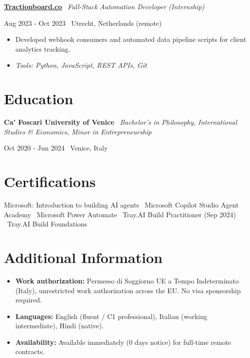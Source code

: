 \documentclass[a4paper,10pt]{article}
\newcommand{\role}[4]{%
  \vspace{2pt}\noindent
  \begin{minipage}[t]{0.70\textwidth}\raggedright\textbf{#1} \textbullet\ \textit{#3}\end{minipage}%
  \hfill
  \begin{minipage}[t]{0.28\textwidth}\raggedleft\footnotesize\color{gray}#2 \textbullet\ #4\end{minipage}%
  \vspace{1pt}%
}
\begin{document}
\role{\href{https://tractionboard.co}{Tractionboard.co}}{Aug 2023 - Oct 2023}{Full-Stack Automation Developer (Internship)}{Utrecht, Netherlands (remote)}
\begin{itemize}
  \item Developed webhook consumers and automated data pipeline scripts for client analytics tracking.
  \item \textit{Tools: Python, JavaScript, REST APIs, Git}
\end{itemize}

\section{Education}
\role{Ca' Foscari University of Venice}{Oct 2020 - Jun 2024}{Bachelor's in Philosophy, International Studies \& Economics, Minor in Entrepreneurship}{Venice, Italy}

\section{Certifications}
Microsoft: Introduction to building AI agents \textbullet\ Microsoft Copilot Studio Agent Academy \textbullet\ Microsoft Power Automate \textbullet\ Tray.AI Build Practitioner (Sep 2024) \textbullet\ Tray.AI Build Foundations

\section{Additional Information}
\begin{itemize}
  \item \textbf{Work authorization:} Permesso di Soggiorno UE a Tempo Indeterminato (Italy), unrestricted work authorization across the EU. No visa sponsorship required.
  \item \textbf{Languages:} English (fluent / C1 professional), Italian (working intermediate), Hindi (native).
  \item \textbf{Availability:} Available immediately (0 days notice) for full-time remote contracts.
\end{itemize}

\end{document}
